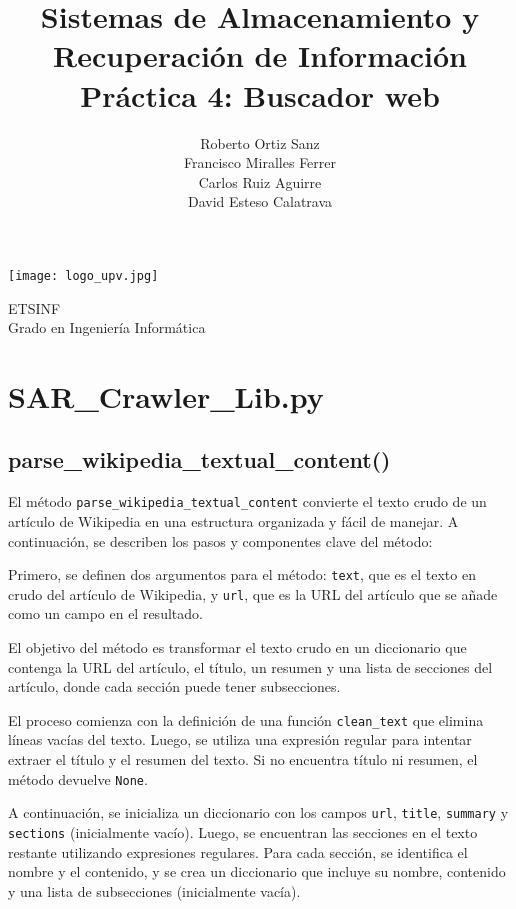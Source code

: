 \documentclass[12pt,a4paper]{article}
\title{\textbf{Sistemas de Almacenamiento y\\ Recuperación de Información\\Práctica 4: Buscador web}}
\author{Roberto Ortiz Sanz \\ Francisco Miralles Ferrer \\ Carlos Ruiz Aguirre \\ David Esteso Calatrava}
\begin{document}
\begin{titlepage}
\maketitle
\begin{center}

\vspace{10mm}

\texttt{[image: logo\_upv.jpg]}

\vfill

\large
ETSINF\\
Grado en Ingeniería Informática
\end{center}
\end{titlepage}

\tableofcontents

\newpage

\section{SAR\_Crawler\_Lib.py}
\subsection{parse\_wikipedia\_textual\_content()}
El método \texttt{parse\_wikipedia\_textual\_content} convierte el texto crudo de un artículo de Wikipedia en una estructura organizada y fácil de manejar. A continuación, se describen los pasos y componentes clave del método:

Primero, se definen dos argumentos para el método: \texttt{text}, que es el texto en crudo del artículo de Wikipedia, y \texttt{url}, que es la URL del artículo que se añade como un campo en el resultado.

El objetivo del método es transformar el texto crudo en un diccionario que contenga la URL del artículo, el título, un resumen y una lista de secciones del artículo, donde cada sección puede tener subsecciones.

El proceso comienza con la definición de una función \texttt{clean\_text} que elimina líneas vacías del texto. Luego, se utiliza una expresión regular para intentar extraer el título y el resumen del texto. Si no encuentra título ni resumen, el método devuelve \texttt{None}.

A continuación, se inicializa un diccionario con los campos \texttt{url}, \texttt{title}, \texttt{summary} y \texttt{sections} (inicialmente vacío). Luego, se encuentran las secciones en el texto restante utilizando expresiones regulares. Para cada sección, se identifica el nombre y el contenido, y se crea un diccionario que incluye su nombre, contenido y una lista de subsecciones (inicialmente vacía).
\end{document}
